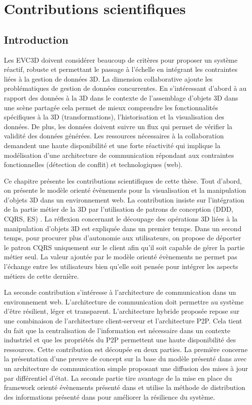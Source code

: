 \chapter{Contributions scientifiques}
\chaptertable
\section{Introduction}
Les \gls{EVC3D} doivent considérer beaucoup de critères pour 
proposer un système réactif, robuste et permettant le passage à l'échelle en 
intégrant les contraintes liées à la gestion de données 3D. La dimension 
collaborative ajoute les problématiques de gestion de données concurrentes.
En s'intéressant d'abord à au rapport des données à la 3D dans le contexte de 
l'assemblage d'objets 3D dans une scène partagée cela permet de 
mieux comprendre les fonctionnalités spécifiques à la 3D (transformations), 
l'historisation et la visualisation des données. De plus, les données 
doivent suivre un flux qui permet de vérifier la validité des données générées.
Les ressources nécessaires à la collaboration demandent une haute disponibilité 
et une forte réactivité qui implique la modélisation d'une architecture 
de communication répondant aux contraintes fonctionnelles (détection de conflit) 
et technologiques (web).

Ce chapitre présente les contributions scientifiques de cette thèse.
Tout d'abord, on présente le modèle orienté évènements pour la 
visualisation et la manipulation d'objets 3D dans un environnement web. La 
contribution insiste sur l'intégration de la partie métier de la 3D par l'utilisation de 
patrons de conception (\gls{DDD}, \gls{CQRS}, \gls{ES}) . La réflexion concernant 
le découpage des opérations 3D liées à la manipulation d'objets 3D est expliquée 
dans un premier temps. Dans un second temps, pour procurer plus d'autonomie 
aux utilisateurs, on propose de déporter le patron \gls{CQRS} uniquement sur le 
client afin qu'il soit capable de gérer la partie métier seul. La valeur ajoutée par le 
modèle orienté évènements ne permet pas l'échange entre les utilisateurs bien 
qu'elle soit pensée pour intégrer les aspects métiers de cette dernière. 

La seconde contribution s'intéresse à l'architecture de 
communication dans un environnement web. L'architecture de communication doit 
permettre au système d'être résilient, léger et transparent. 
L'architecture hybride proposée repose sur une combinaison de l'architecture 
client-serveur et l'architecture P2P. 
Cela tient du fait que la centralisation de l'information est nécessaire dans un 
contexte industriel et que les propriétés du P2P permettent une haute disponibilité 
des ressources. Cette contribution est découpée en deux parties. La première 
concerne la présentation d'une preuve de concept sur la base du modèle présenté 
dans \cite{Desprat2015a} avec un architecture de communication simple 
proposant une diffusion des mises à jour par différentiel d'état. La seconde partie 
tire avantage de la mise en place du framework orienté évènements présenté dans 
\cite{Desprat2016} et utilise la méthode de distribution des informations présenté 
dans \cite{Desprat2017} pour améliorer la résilience du système. 

